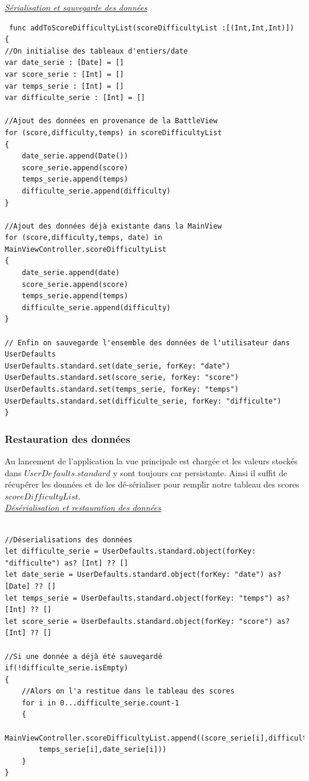 \documentclass{article}
\begin{document}
\noindent \underline{\textit{Sérialisation et sauvegarde des données}}
\begin{verbatim}
 func addToScoreDifficultyList(scoreDifficultyList :[(Int,Int,Int)])
{
//On initialise des tableaux d'entiers/date
var date_serie : [Date] = []
var score_serie : [Int] = []
var temps_serie : [Int] = []
var difficulte_serie : [Int] = []

//Ajout des données en provenance de la BattleView
for (score,difficulty,temps) in scoreDifficultyList
{
    date_serie.append(Date())
    score_serie.append(score)
    temps_serie.append(temps)
    difficulte_serie.append(difficulty)
}

//Ajout des données déjà existante dans la MainView
for (score,difficulty,temps, date) in MainViewController.scoreDifficultyList
{
    date_serie.append(date)
    score_serie.append(score)
    temps_serie.append(temps)
    difficulte_serie.append(difficulty)
}

// Enfin on sauvegarde l'ensemble des données de l'utilisateur dans UserDefaults
UserDefaults.standard.set(date_serie, forKey: "date")
UserDefaults.standard.set(score_serie, forKey: "score")
UserDefaults.standard.set(temps_serie, forKey: "temps")
UserDefaults.standard.set(difficulte_serie, forKey: "difficulte")
}
\end{verbatim}

\subsubsection{Restauration des données}

Au lancement de l'application la vue principale est chargée et les valeurs stockés dans $UserDefaults.standard$ y sont toujours car persistante. Ainsi il suffit de récupérer les données et de les dé-sérialiser pour remplir notre tableau des scores $scoreDifficultyList$.\\

\noindent \underline{\textit{Désérialisation et restauration des données}}
\begin{verbatim}

//Déserialisations des données
let difficulte_serie = UserDefaults.standard.object(forKey: "difficulte") as? [Int] ?? []
let date_serie = UserDefaults.standard.object(forKey: "date") as? [Date] ?? []
let temps_serie = UserDefaults.standard.object(forKey: "temps") as? [Int] ?? []
let score_serie = UserDefaults.standard.object(forKey: "score") as? [Int] ?? []

//Si une donnée a déjà été sauvegardé
if(!difficulte_serie.isEmpty)
{
    //Alors on l'a restitue dans le tableau des scores
    for i in 0...difficulte_serie.count-1
    {
        MainViewController.scoreDifficultyList.append((score_serie[i],difficulte_serie[i],
        temps_serie[i],date_serie[i]))
    }
}
\end{verbatim}
\end{document}
